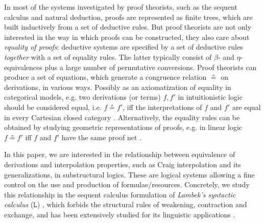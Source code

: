 \documentclass[a4paper,UKenglish,cleveref,autoref,thm-restate, anonymous]{lipics-v2021}
\newcommand{\GG}{\Gamma}
\renewcommand{\L}{$\mathtt{L}$}
\newcommand{\vd}{\vdash}
\begin{document}
In most of the systems investigated by proof theorists, such as the sequent calculus and natural deduction, proofs are represented as finite trees, which are built inductively from a set of deductive rules.
But proof theorists are not only interested in the way in which proofs can be constructed, they also care about \emph{equality of proofs}: deductive systems are specified by a set of deductive rules \emph{together} with a set of equality rules. The latter typically consist of $\beta$- and $\eta$-equivalences plus a large number of permutative conversions.
Proof theorists can produce a set of equations, which generate a congruence relation $\circeq$ on derivations, in various ways. Possibly as an axiomatization of equality in categorical models, e.g. two derivations (or terms) $f,f'$ in intuitionistic logic should be considered equal, i.e. $f \circeq f'$, iff the interpretations of $f$ and $f'$ are equal in every Cartesian closed category \cite{lambekscott1988}. Alternatively, the equality rules can be obtained by studying geometric representations of proofs, e.g. in linear logic $f \circeq f'$ iff $f$ and $f'$ have the same proof net \cite{girard:linear:87}.

In this paper, we are interested in the relationship between equivalence of derivations and interpolation properties, such as Craig interpolation and its generalizations, in substructural logics. These are logical systems allowing a fine control on the use and production of formulae/resources. Concretely, we study this relationship in the sequent calculus formulation of \emph{Lambek's syntactic calculus} (\L) \cite{lambek:mathematics:58}, which forbids the structural rules of weakening, contraction and exchange,
and has been extensively studied for its linguistic applications \cite{moot:categorial:2012}.
\end{document}
